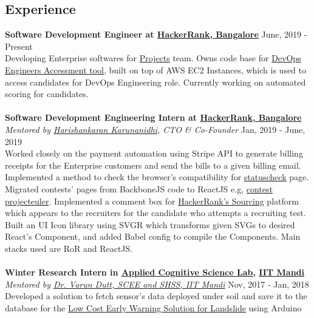\documentclass[margin, centered]{res}
\begin{document}
\begin{resume}
    \section{Experience}
    \textbf{Software Development Engineer at \href{https://www.hackerrank.com}{HackerRank, Bangalore}} \hfill June, 2019 - Present \\
    Developing Enterprise softwares for \href{https://www.hackerrank.com/products/projects}{Projects} team. Owns code base for \href{https://www.hackerrank.com/products/projects#role5}{DevOps Engineers Accessment tool},
    built on top of AWS EC2 Instances, which is used to access candidates for DevOps Engineering role. Currently working on automated scoring for candidates.\\
    \\
    \textbf{Software Development Engineering Intern at \href{https://www.hackerrank.com}{HackerRank, Bangalore}} \\
    \emph{Mentored by \href{https://www.hackerrank.com/about-us/our-team/}{Harishankaran
            Karunanidhi}\footnotesize{, CTO \& Co-Founder}} \hfill Jan, 2019 - June, 2019 \\
    Worked closely on the payment automation using Stripe API to generate billing receipts for
    the Enterprise customers and send the bills to a given billing email. Implemented a method to check the browser's compatibility
    for \href{https://www.hackerrank.com/statuscheck}{statuscheck} page. Migrated contests' pages from
    BackboneJS code to ReactJS e.g, \href{https://www.hackerrank.com/projecteuler/}{contest projecteuler}.
    Implemented a comment box for \href{https://www.hackerrank.com/work}{HackerRank's Sourcing} platform
    which appears to the recruiters for the candidate who attempts a recruiting test. Built an UI Icon library
    using SVGR which transforms given SVGs to desired React's Component, and added Babel config to compile
    the Components. Main stacks used are RoR and ReactJS. \\
    \\
    \textbf{Winter Research Intern in \href{http://acslab.org}{Applied Cognitive Science Lab,} \href{https://iitmandi.ac.in/}{IIT Mandi}} \\
    \emph{Mentored by \href{https://faculty.iitmandi.ac.in/~varun/}{Dr. Varun Dutt, SCEE and SHSS, IIT Mandi}} \hfill Nov, 2017 - Jan, 2018 \\
    Developed a solution to fetch sensor’s data deployed under soil and save it to the database for the
    \href{http://landslidemonitoring.esy.es/}{Low Cost Early Warning Solution for Landslide} using Arduino

\end{resume}
\end{document}
